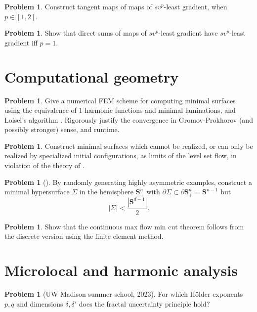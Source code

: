 \documentclass[reqno,11pt]{amsart}
\newcommand{\Sph}{\mathbf S}
\theoremstyle{definition}
\newtheorem{problem}[theorem]{Problem}
\numberwithin{equation}{section}
\begin{document}
\begin{problem}
Construct tangent maps of maps of $sv^p$-least gradient, when $p \in [1, 2]$.
\end{problem}

\begin{problem}
Show that direct sums of maps of $sv^p$-least gradient have $sv^p$-least gradient iff $p = 1$.
\end{problem}

\section{Computational geometry}
\begin{problem}
Give a numerical FEM scheme for computing minimal surfaces using the equivalence of $1$-harmonic functions and minimal laminations, and Loisel's algorithm \cite{Loisel20}.
Rigorously justify the convergence in Gromov-Prokhorov (and possibly stronger) sense, and runtime.
\end{problem}

\begin{problem}
Construct minimal surfaces which cannot be realized, or can only be realized by specialized initial configurations, as limits of the level set flow, in violation of the theory of \cite{CHOPP199377}.
\end{problem}

\begin{problem}[{\cite[Conjecture 5.3]{naff2022prescribed}}]
By randomly generating highly asymmetric examples, construct a minimal hypersurface $\Sigma$ in the hemisphere $\Sph^n_+$ with $\partial \Sigma \subset \partial \Sph^n_+ = \Sph^{n - 1}$ but
$$|\Sigma| < \frac{|\Sph^{d - 1}|}{2}.$$
\end{problem}

\begin{problem}
Show that the continuous max flow min cut theorem follows from the discrete version using the finite element method.
\end{problem}

\section{Microlocal and harmonic analysis}
\begin{problem}[UW Madison summer school, 2023]
For which H\"older exponents $p, q$ and dimensions $\delta, \delta'$ does the fractal uncertainty principle hold?
\end{problem}
\end{document}
